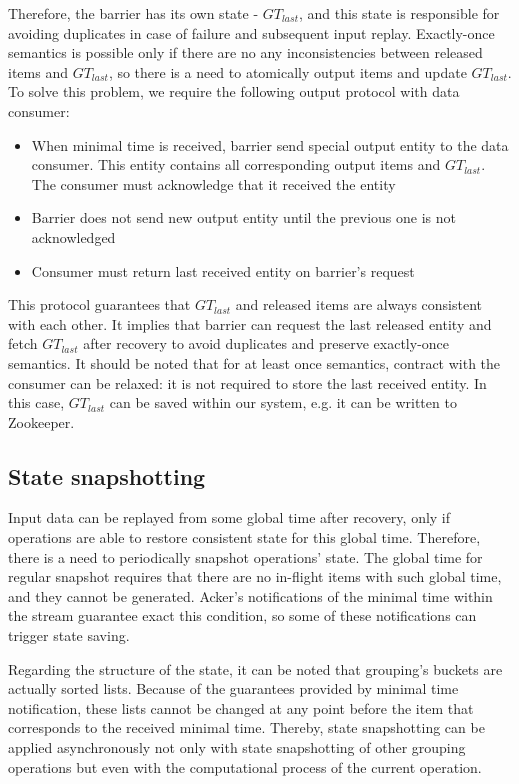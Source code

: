 Therefore, the barrier has its own state - $GT_{last}$, and this state is responsible for avoiding duplicates in case of failure and subsequent input replay. Exactly-once semantics is possible only if there are no any inconsistencies between released items and $GT_{last}$, so there is a need to atomically output items and update $GT_{last}$. To solve this problem, we require the following output protocol with data consumer:

\begin{itemize}
    \item When minimal time is received, barrier send special output entity to the data consumer. This entity contains all corresponding output items and $GT_{last}$. The consumer must acknowledge that it received the entity
    \item Barrier does not send new output entity until the previous one is not acknowledged
    \item Consumer must return last received entity on barrier's request 
\end{itemize}

This protocol guarantees that $GT_{last}$ and released items are always consistent with each other. It implies that barrier can request the last released entity and fetch $GT_{last}$ after recovery to avoid duplicates and preserve exactly-once semantics. It should be noted that for at least once semantics, contract with the consumer can be relaxed: it is not required to store the last received entity. In this case, $GT_{last}$ can be saved within our system, e.g. it can be written to Zookeeper.

\subsection{State snapshotting}
Input data can be replayed from some global time after recovery, only if operations are able to restore consistent state for this global time. Therefore, there is a need to periodically snapshot operations' state. The global time for regular snapshot requires that there are no in-flight items with such global time, and they cannot be generated. Acker's notifications of the minimal time within the stream guarantee exact this condition, so some of these notifications can trigger state saving. 

Regarding the structure of the state, it can be noted that grouping's buckets are actually sorted lists. Because of the guarantees provided by minimal time notification, these lists cannot be changed at any point before the item that corresponds to the received minimal time. Thereby, state snapshotting can be applied asynchronously not only with state snapshotting of other grouping operations but even with the computational process of the current operation. 

